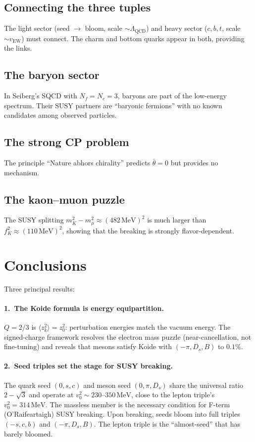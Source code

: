 \documentclass[12pt,a4paper]{article}
\newcommand{\MeV}{\,\text{MeV}}
\begin{document}
\subsection{Connecting the three tuples}
The light sector (seed $\to$ bloom, scale $\sim \Lambda_{\text{QCD}}$) 
and heavy sector ($c,b,t$, scale $\sim v_{\text{EW}}$) must connect. 
The charm and bottom quarks appear in both, providing the links.

\subsection{The baryon sector}
In Seiberg's SQCD with $N_f = N_c = 3$, baryons are part of the 
low-energy spectrum. Their SUSY partners are ``baryonic fermions'' 
with no known candidates among observed particles.

\subsection{The strong CP problem}
The principle ``Nature abhors chirality'' predicts $\bar{\theta} = 0$ 
but provides no mechanism.

\subsection{The kaon--muon puzzle}
The SUSY splitting $m_K^2 - m_\mu^2 \approx (482\MeV)^2$ is much 
larger than $f_K^2 \approx (110\MeV)^2$, showing that the breaking 
is strongly flavor-dependent.

\section{Conclusions}
\label{sec:conclusions}

Three principal results:

\paragraph{1.\ The Koide formula is energy equipartition.}
$Q = 2/3$ is $\langle z_k^2\rangle = z_0^2$: perturbation energies 
match the vacuum energy. The signed-charge framework resolves the 
electron mass puzzle (near-cancellation, not fine-tuning) and reveals 
that mesons satisfy Koide with $(-\pi, D_s, B)$ to $0.1\%$.

\paragraph{2.\ Seed triples set the stage for SUSY breaking.}
The quark seed $(0,s,c)$ and meson seed $(0,\pi,D_s)$ share the 
universal ratio $2 - \sqrt{3}$ and operate at $v_0^2 \sim 
230$--$350\MeV$, close to the lepton triple's $v_0^2 = 314\MeV$. 
The massless member is the necessary condition for F-term 
(O'Raifeartaigh) SUSY breaking. Upon breaking, seeds bloom into 
full triples $(-s,c,b)$ and $(-\pi,D_s,B)$. The lepton triple 
is the ``almost-seed'' that has barely bloomed.
\end{document}
